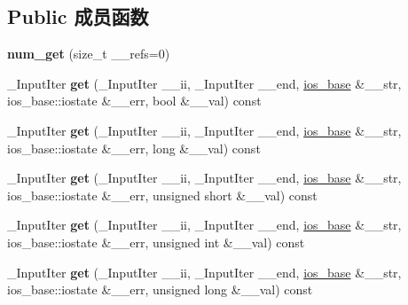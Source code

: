 \subsection*{Public 成员函数}
\begin{DoxyCompactItemize}
\item 
\mbox{\label{classnum__get_a1ccb143303d0e0c33761b80e1c4e11cd}} 
{\bfseries num\+\_\+get} (size\+\_\+t \+\_\+\+\_\+refs=0)
\item 
\mbox{\label{classnum__get_ac74f5487ab5b3dfb9e3840a1108c7339}} 
\+\_\+\+Input\+Iter {\bfseries get} (\+\_\+\+Input\+Iter \+\_\+\+\_\+ii, \+\_\+\+Input\+Iter \+\_\+\+\_\+end, \hyperlink{classios__base}{ios\+\_\+base} \&\+\_\+\+\_\+str, ios\+\_\+base\+::iostate \&\+\_\+\+\_\+err, bool \&\+\_\+\+\_\+val) const
\item 
\mbox{\label{classnum__get_a30e65d3200d5ec56118ac513f0445852}} 
\+\_\+\+Input\+Iter {\bfseries get} (\+\_\+\+Input\+Iter \+\_\+\+\_\+ii, \+\_\+\+Input\+Iter \+\_\+\+\_\+end, \hyperlink{classios__base}{ios\+\_\+base} \&\+\_\+\+\_\+str, ios\+\_\+base\+::iostate \&\+\_\+\+\_\+err, long \&\+\_\+\+\_\+val) const
\item 
\mbox{\label{classnum__get_a07ed9e5b75ad110661cb2bdb64634296}} 
\+\_\+\+Input\+Iter {\bfseries get} (\+\_\+\+Input\+Iter \+\_\+\+\_\+ii, \+\_\+\+Input\+Iter \+\_\+\+\_\+end, \hyperlink{classios__base}{ios\+\_\+base} \&\+\_\+\+\_\+str, ios\+\_\+base\+::iostate \&\+\_\+\+\_\+err, unsigned short \&\+\_\+\+\_\+val) const
\item 
\mbox{\label{classnum__get_a4d209ee4f859f92db2a99d399657dd85}} 
\+\_\+\+Input\+Iter {\bfseries get} (\+\_\+\+Input\+Iter \+\_\+\+\_\+ii, \+\_\+\+Input\+Iter \+\_\+\+\_\+end, \hyperlink{classios__base}{ios\+\_\+base} \&\+\_\+\+\_\+str, ios\+\_\+base\+::iostate \&\+\_\+\+\_\+err, unsigned int \&\+\_\+\+\_\+val) const
\item 
\mbox{\label{classnum__get_a4d987839db18db1bfa9c38602b779447}} 
\+\_\+\+Input\+Iter {\bfseries get} (\+\_\+\+Input\+Iter \+\_\+\+\_\+ii, \+\_\+\+Input\+Iter \+\_\+\+\_\+end, \hyperlink{classios__base}{ios\+\_\+base} \&\+\_\+\+\_\+str, ios\+\_\+base\+::iostate \&\+\_\+\+\_\+err, unsigned long \&\+\_\+\+\_\+val) const
\item 

\end{DoxyCompactItemize}
